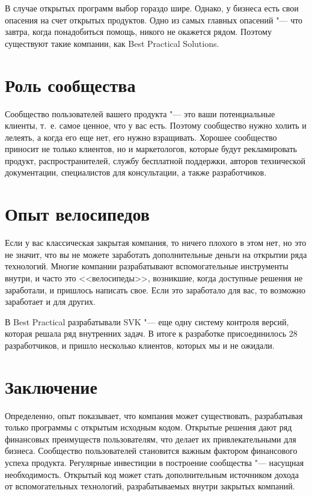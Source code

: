 В случае открытых программ выбор гораздо шире. Однако, у бизнеса есть свои опасения на счет
открытых продуктов. Одно из самых главных опасений "--- что завтра, когда понадобиться
помощь, никого не окажется рядом. Поэтому существуют такие компании, как Best Practical
Solutions.

\section*{Роль сообщества}

Сообщество пользователей вашего продукта "--- это ваши потенциальные клиенты,
т.~е. самое ценное, что у вас есть. Поэтому
сообщество нужно холить и лелеять, а когда его еще нет, его нужно
взращивать. Хорошее сообщество приносит не только клиентов, но и
маркетологов, которые будут рекламировать продукт, распространителей,
службу бесплатной поддержки, авторов технической документации,
специалистов для консультации, а также разработчиков.

\section*{Опыт велосипедов}

Если у вас классическая закрытая компания, то ничего плохого в этом нет, но
это не значит, что вы не можете заработать дополнительные деньги на открытии
ряда технологий. 
Многие компании разрабатывают вспомогательные инструменты внутри, и часто
это <<велосипеды>>, возникшие, когда доступные решения не заработали, и пришлось написать
свое. Если это заработало для вас, то возможно заработает и для других.

В Best Practical разрабатывали SVK "--- еще одну систему контроля версий,
которая решала ряд внутренних задач. В итоге к разработке присоединилось
28 разработчиков, и пришло несколько клиентов, которых мы и не ожидали.

\section*{Заключение}

Определенно, опыт показывает, что компания может существовать, разрабатывая
только программы с открытым исходным кодом. Открытые решения дают ряд
финансовых преимуществ пользователям, что делает их привлекательными для
бизнеса. Сообщество пользователей становится важным фактором финансового
успеха продукта. Регулярные инвестиции в построение сообщества "--- насущная
необходимость. Открытый код может стать дополнительным источником дохода
от вспомогательных технологий, разрабатываемых внутри закрытых компаний.





